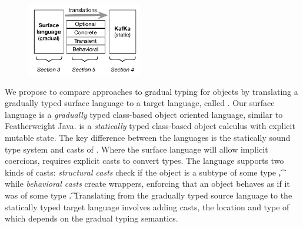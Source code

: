 \documentclass[USenglish]{tex/lipics-v2016}
\begin{document}
\begin{figure}
\vspace{-6mm}
\includegraphics[width=5cm]{fig1}




\vspace{-7mm}\end{figure}

We propose to compare approaches to gradual typing for objects by translating
a gradually typed surface language to a target language, called \kafka. Our
surface language is a \emph{gradually} typed class-based object oriented
language, similar to Featherweight Java. \kafka is a \emph{statically} typed
class-based object calculus with explicit mutable state. The key difference
between the languages is the statically sound type system and casts of \kafka.
Where the surface language will allow implicit coercions, \kafka requires
explicit casts to convert types. The \kafka language supports two kinds of
casts: \emph{structural casts} check if the object is a subtype of some type
\t, while \emph{behavioral casts} create wrappers, enforcing that an object
behaves as if it was of some type \t. Translating from the gradually typed
source language to the statically typed target language involves adding casts,
the location and type of which depends on the gradual typing semantics.
\end{document}
